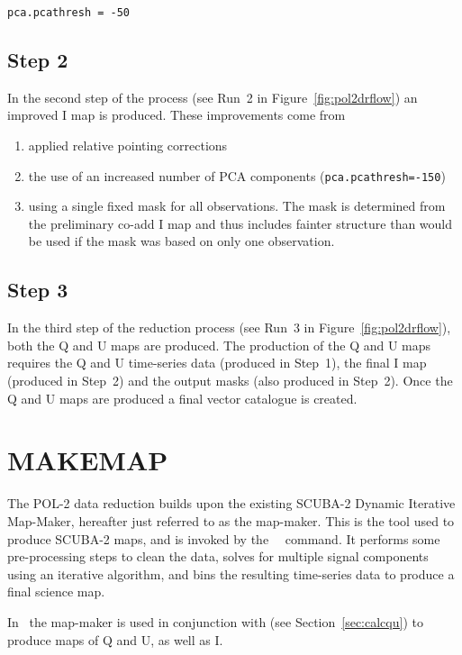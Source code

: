 \texttt{pca.pcathresh = -50}



\subsection*{Step 2}

In the second step of the process (see Run~2 in
Figure~\ref{fig:pol2drflow}) an improved I map is produced. These
improvements come from
\begin{enumerate}
\item applied relative pointing corrections
\item the use of an increased number of PCA components
  (\texttt{pca.pcathresh=-150})
\item using a single fixed mask for all observations. The mask is
  determined from the preliminary co-add I map and thus includes
  fainter structure than would be used if the mask was based on only
  one observation.
\end{enumerate}

\subsection*{Step 3}

In the third step of the reduction process (see Run~3 in
Figure~\ref{fig:pol2drflow}), both the Q and U maps are produced. The production
of the Q and U maps requires the Q and U time-series data (produced in
Step~1), the final I map (produced in Step~2) and the output masks (also
produced in Step~2). Once the Q and U maps are produced a final vector
catalogue is created.

\section{MAKEMAP}

The POL-2 data reduction builds upon the existing SCUBA-2 Dynamic
Iterative Map-Maker, hereafter just referred to as the map-maker. This
is the tool used to produce SCUBA-2 maps, and is invoked by the
\SMURF\ \makemap\ command. It performs some
pre-processing steps to clean the data, solves for multiple signal
components using an iterative algorithm, and bins the resulting
time-series data to produce a final science map.

In \poltwomap\ the map-maker is used in conjunction with
 (see
Section~\ref{sec:calcqu}) to produce maps of Q and U, as well as I.

